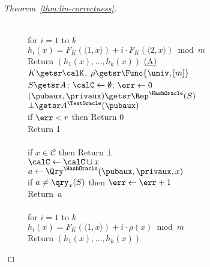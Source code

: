 \begin{proof}[Theorem~\ref{thm:lin-correctness}]
\begin{figure}[tp]
{{\medskip
{}\\
for $i = 1$ to $k$\\
\nudge $h_i(x) = F_{K}(\langle 1,x \rangle) + i\cdot F_{K}(\langle 2,x \rangle) \bmod m$\\
Return $\left(h_1(x),\ldots,h_k(x)\right)$
}
{
\underline{(A)}\\
$K \getsr \calK $, $\rho \getsr \Func{\univ,[m]}$\\
$S \getsr A$; $\calC \gets \emptyset$; $\err \gets 0$\\
$(\pubaux,\privaux) \getsr \Rep^{\HashOracle}(S)$\\
$\bot \getsr A^{\TestOracle}(\pubaux)$\\
if $\err  < r$ then Return 0\\
Return 1\\

\medskip
{}\\
if $x \in \mathcal{C}$ then Return $\bot$\\
$\calC \gets \calC \cup x$\\
$a \gets \Qry^{\HashOracle}(\pubaux,\privaux, x)$\\
if $a \neq \qry_x(S)$ then $\err \gets \err + 1$\\
Return~$a$\\

\medskip
{}\\
for $i=1$ to $k$\\
\nudge $h_i(x) = F_{K}(\langle 1,x \rangle) + i \cdot \rho(x) \bmod m$\\
Return $\left(h_1(x),\ldots,h_k(x)\right)$
}
}
\end{figure}
\end{proof}
